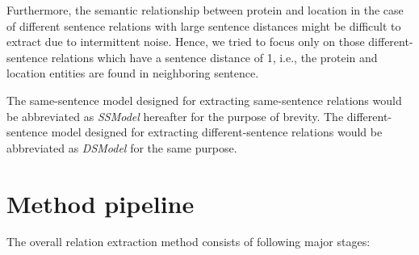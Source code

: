 Furthermore, the semantic relationship between protein and location in the case of different sentence relations with large sentence distances might be difficult to extract due to intermittent noise. Hence, we tried to focus only on those different-sentence relations which have a sentence distance of 1, i.e., the protein and location entities are found in neighboring sentence.

The same-sentence model designed for extracting same-sentence relations would be  abbreviated as \textit{SSModel} hereafter for the purpose of brevity. The different-sentence model designed for extracting different-sentence relations would be abbreviated as \textit{DSModel} for the same purpose.

\section{Method pipeline}\label{sec:pipeline}


The overall relation extraction method consists of following major stages:

